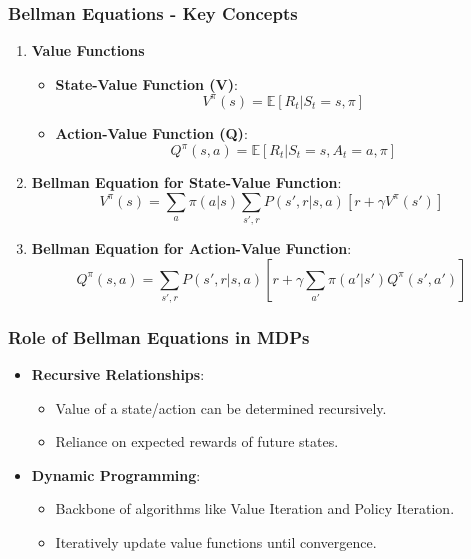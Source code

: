 \documentclass{beamer}
\begin{document}
\begin{frame}[fragile]
    \frametitle{Bellman Equations - Key Concepts}
    \begin{enumerate}
        \item \textbf{Value Functions}
        \begin{itemize}
            \item \textbf{State-Value Function (V)}:
            \[
            V^\pi(s) = \mathbb{E}[R_t | S_t = s, \pi]
            \]
            \item \textbf{Action-Value Function (Q)}:
            \[
            Q^\pi(s, a) = \mathbb{E}[R_t | S_t = s, A_t = a, \pi]
            \]
        \end{itemize}
        
        \item \textbf{Bellman Equation for State-Value Function}:
        \[
        V^\pi(s) = \sum_{a} \pi(a | s) \sum_{s', r} P(s', r | s, a) [r + \gamma V^\pi(s')]
        \]
        
        \item \textbf{Bellman Equation for Action-Value Function}:
        \[
        Q^\pi(s, a) = \sum_{s', r} P(s', r | s, a) [r + \gamma \sum_{a'} \pi(a' | s') Q^\pi(s', a')]
        \]
    \end{enumerate}
\end{frame}

\begin{frame}[fragile]
    \frametitle{Role of Bellman Equations in MDPs}
    \begin{itemize}
        \item \textbf{Recursive Relationships}:
        \begin{itemize}
            \item Value of a state/action can be determined recursively.
            \item Reliance on expected rewards of future states.
        \end{itemize}
        \item \textbf{Dynamic Programming}:
        \begin{itemize}
            \item Backbone of algorithms like Value Iteration and Policy Iteration.
            \item Iteratively update value functions until convergence.
        \end{itemize}
    \end{itemize}
\end{frame}
\end{document}
